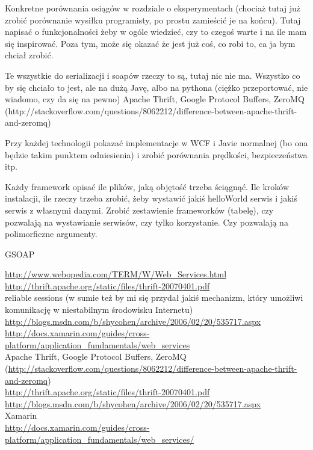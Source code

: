 \documentclass[twoside,a4paper]{book}
\begin{document}
Konkretne porównania osiągów w rozdziale o eksperymentach (chociaż tutaj już zrobić porównanie wysiłku programisty, po prostu zamieścić je na końcu). Tutaj napisać o funkcjonalności żeby w ogóle wiedzieć, czy to czegoś warte i na ile mam się inspirować. Poza tym, może się okazać że jest już coś, co robi to, ca ja bym chciał zrobić.

Te wszystkie do serializacji i soapów rzeczy to są, tutaj nic nie ma. Wszystko co by się chciało to jest, ale na dużą Javę, albo na pythona (ciężko przeportować, nie wiadomo, czy da się na pewno) Apache Thrift, Google Protocol Buffers, ZeroMQ (http://stackoverflow.com/questions/8062212/difference-between-apache-thrift-and-zeromq)

Przy każdej technologii pokazać implementacje w WCF i Javie normalnej (bo ona będzie takim punktem odniesienia) i zrobić porównania prędkości, bezpieczeństwa itp.

Każdy framework opisać ile plików, jaką objętość trzeba ściągnąć. Ile kroków instalacji, ile rzeczy trzeba zrobić, żeby wystawić jakiś helloWorld serwis i jakiś serwis z własnymi danymi. Zrobić zestawienie frameworków (tabelę), czy pozwalają na wystawianie serwisów, czy tylko korzystanie. Czy pozwalają na polimorficzne argumenty.

GSOAP

\url{http://www.webopedia.com/TERM/W/Web_Services.html}\\
\url{http://thrift.apache.org/static/files/thrift-20070401.pdf}\\
reliable sessions (w sumie też by mi się przydał jakiś mechanizm, który umożliwi komunikację w niestabilnym środowisku Internetu)\\
\url{http://blogs.msdn.com/b/shycohen/archive/2006/02/20/535717.aspx}\\
\url{http://docs.xamarin.com/guides/cross-platform/application_fundamentals/web_services}\\

Apache Thrift, Google Protocol Buffers, ZeroMQ (\url{http://stackoverflow.com/questions/8062212/difference-between-apache-thrift-and-zeromq})\\
\url{http://thrift.apache.org/static/files/thrift-20070401.pdf}\\
\url{http://blogs.msdn.com/b/shycohen/archive/2006/02/20/535717.aspx}\\
Xamarin\\
\url{http://docs.xamarin.com/guides/cross-platform/application_fundamentals/web_services/}\\
\end{document}
